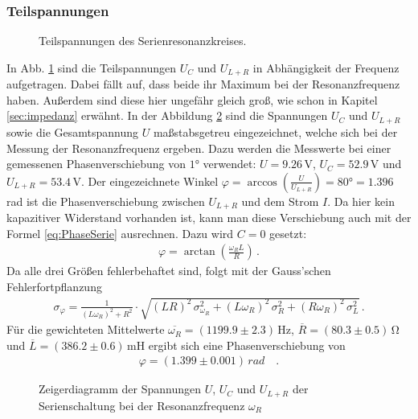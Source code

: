 \documentclass[12pt,a4paper,titlepage,headinclude,bibtotoc]{scrartcl}
\begin{document}
\subsubsection{Teilspannungen}
\begin{figure}[!htb]
	\centering
	
	\caption{Teilspannungen des Serienresonanzkreises.}
	\label{fig:teilU}
\end{figure}
In Abb. \ref{fig:teilU} sind die Teilspannungen $U_C$ und $U_{L+R}$ in Abhängigkeit der Frequenz aufgetragen.
Dabei fällt auf, dass beide ihr Maximum bei der Resonanzfrequenz haben.
Außerdem sind diese hier ungefähr gleich groß, wie schon in Kapitel \ref{sec:impedanz} erwähnt.
In der Abbildung \ref{fig:zeigerU} sind die Spannungen $U_C$ und $U_{L+R}$ sowie die Gesamtspannung $U$ maßstabsgetreu eingezeichnet, welche sich bei der Messung der Resonanzfrequenz ergeben.
Dazu werden die Messwerte bei einer gemessenen Phasenverschiebung von $1\si\degree$ verwendet: $U=9.26\,$V, $U_C=52.9\,$V und $U_{L+R}=53.4\,$V. 
Der eingezeichnete Winkel $\varphi=\arccos\left(\frac{U}{U_{L+R}}\right)=80\si\degree=1.396\,$rad ist die Phasenverschiebung zwischen $U_{L+R}$ und dem Strom $I$.
Da hier kein kapazitiver Widerstand vorhanden ist, kann man diese Verschiebung auch mit der Formel \eqref{eq:PhaseSerie} ausrechnen. Dazu wird $C=0$ gesetzt:
\begin{align*}
	\varphi=\arctan\left(\frac{\omega_R L}{R}\right)\,.
\end{align*}
Da alle drei Größen fehlerbehaftet sind, folgt mit der Gauss'schen Fehlerfortpflanzung
\begin{align*}	
	\sigma_{\varphi}=\frac{1}{(L \omega_R)^{2} + R^{2}} \cdot \sqrt{(LR)^{2}\, \sigma_{\omega_R}^{2} + (L \omega_R)^{2}\,\sigma_{R}^{2}  + (R \omega_R)^{2}\,\sigma_{L}^{2}}\,.
\end{align*}
Für die gewichteten Mittelwerte $\overline{\omega_R}=(1199.9\pm 2.3)\,\si\hertz$, $\overline{R}=(80.3 \pm 0.5)\,\si\ohm$ und $\overline{L}=(386.2 \pm 0.6)\,\si{\milli\henry}$ ergibt sich eine Phasenverschiebung von
\begin{align*}
	\varphi=(1.399 \pm 0.001)\,\si{rad}\quad.
\end{align*}

\begin{figure}
	\centering	
	\caption{Zeigerdiagramm der Spannungen $U$, $U_C$ und $U_{L+R}$ der Serienschaltung bei der Resonanzfrequenz $\omega_R$}
	\label{fig:zeigerU}
\end{figure}
\end{document}
